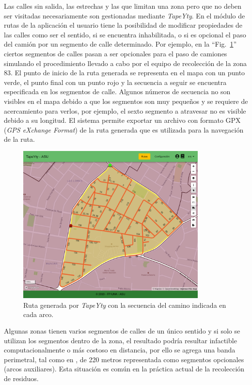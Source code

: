 \documentclass[conference]{IEEEtran}
\begin{document}
Las calles sin salida, las estrechas y las que limitan una zona pero que no deben ser visitadas necesariamente son gestionadas mediante \textit{TapeYty}. En el módulo de rutas de la aplicación el usuario tiene la posibilidad de modificar propiedades de las calles como ser el sentido, si se encuentra inhabilitada, o si es opcional el paso del camión por un segmento de calle determinado. Por ejemplo, en la ``Fig.~\ref{fig:RecorridoTapeYtyZona83Opcionales}'' ciertos segmentos de calles pasan a ser opcionales para el paso de camiones simulando el procedimiento llevado a cabo por el equipo de recolección de la zona 83. El punto de inicio de la ruta generada se representa en el mapa con un punto verde, el punto final con un punto rojo y la secuencia a seguir se encuentra especificada en los segmentos de calle. Algunos números de secuencia no son visibles en el mapa debido a que los segmentos son muy pequeños y se requiere de acercamiento para verlos, por ejemplo, el sexto segmento a atravesar no es visible debido a su longitud. El sistema permite exportar un archivo con formato GPX (\textit{GPS eXchange Format}) de la ruta generada que es utilizada para la navegación de la ruta.

\begin{figure}[tbp]
\centerline{\includegraphics[width=0.85\textwidth]{imagenes/recorrido83ConOpcionales.png}}
\caption{Ruta generada por \textit{TapeYty} con la secuencia del camino indicada en cada arco.}
\label{fig:RecorridoTapeYtyZona83Opcionales}
\end{figure}

Algunas zonas tienen varios segmentos de calles de un único sentido y si solo se utilizan los segmentos dentro de la zona, el resultado podría resultar infactible computacionalmente o más costoso en distancia, por ello se agrega una banda perimetral, tal como en \cite{Braier2017AnArgentina}, de 220 metros representada como segmentos opcionales (arcos auxiliares). Esta situación es común en la práctica actual de la recolección de residuos.
\end{document}
